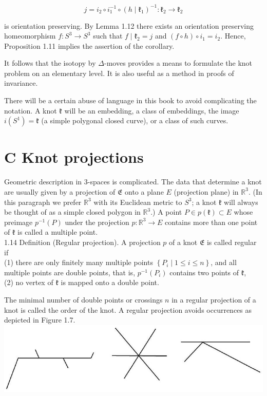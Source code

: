 \documentclass[10pt, letterpaper]{article}
\begin{document}
$$
j=i_{2} \circ i_{1}^{-1} \circ\left(h \mid \mathfrak{k}_{1}\right)^{-1}: \mathfrak{k}_{2} \rightarrow \mathfrak{k}_{2}
$$

is orientation preserving. By Lemma 1.12 there exists an orientation preserving homeomorphism $f: S^{3} \rightarrow S^{3}$ such that $f \mid \mathfrak{k}_{2}=j$ and $(f \circ h) \circ i_{1}=i_{2}$. Hence, Proposition 1.11 implies the assertion of the corollary.

It follows that the isotopy by $\Delta$-moves provides a means to formulate the knot problem on an elementary level. It is also useful as a method in proofs of invariance.

There will be a certain abuse of language in this book to avoid complicating the notation. A knot $\mathfrak{k}$ will be an embedding, a class of embeddings, the image $i\left(S^{1}\right)=\mathfrak{k}$ (a simple polygonal closed curve), or a class of such curves.

\section*{C Knot projections}
Geometric description in 3-spaces is complicated. The data that determine a knot are usually given by a projection of $\mathfrak{E}$ onto a plane $E$ (projection plane) in $\mathbb{R}^{3}$. (In this paragraph we prefer $\mathbb{R}^{3}$ with its Euclidean metric to $S^{3}$; a knot $\mathfrak{k}$ will always be thought of as a simple closed polygon in $\mathbb{R}^{3}$.) A point $P \in p(\mathfrak{k}) \subset E$ whose preimage $p^{-1}(P)$ under the projection $p: \mathbb{R}^{3} \rightarrow E$ contains more than one point of $\mathfrak{k}$ is called a multiple point.\\
1.14 Definition (Regular projection). A projection $p$ of a knot $\mathfrak{E}$ is called regular if\\
(1) there are only finitely many multiple points $\left\{P_{i} \mid 1 \leq i \leq n\right\}$, and all multiple points are double points, that is, $p^{-1}\left(P_{i}\right)$ contains two points of $\mathfrak{k}$,\\
(2) no vertex of $\mathfrak{k}$ is mapped onto a double point.

The minimal number of double points or crossings $n$ in a regular projection of a knot is called the order of the knot. A regular projection avoids occurrences as depicted in Figure 1.7.\\
\includegraphics[scale=0.2, center]{2025_05_21_9c06be8de7a55410f8c1g-023}
\end{document}
